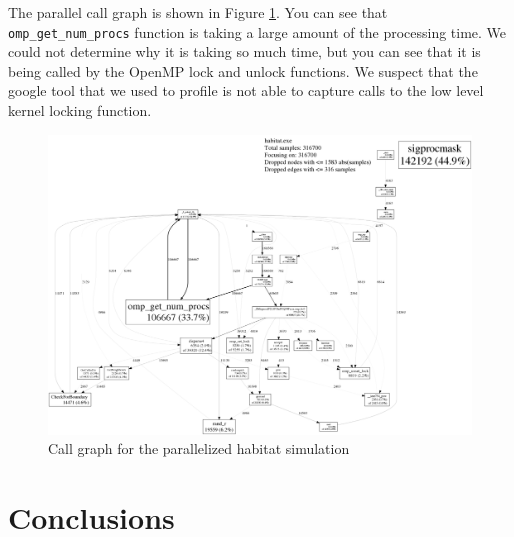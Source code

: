 \documentclass[12pt, notitlepage]{article}
\begin{document}
The parallel call graph is shown in Figure \ref{fig:parallelcall}.  You can see that \texttt{omp\_get\_num\_procs} function is taking a large amount of the processing time.  We could not determine why it is taking so much time, but you can see that it is being called by the OpenMP lock and unlock functions.  We suspect that the google tool that we used to profile is not able to capture calls to the low level kernel locking function.

\begin{figure}[ht]
\includegraphics[width=\textwidth]{Include/parallelcall.pdf}
\caption{Call graph for the parallelized habitat simulation} \label{fig:parallelcall}
\end{figure}

\section{Conclusions}
\end{document}
